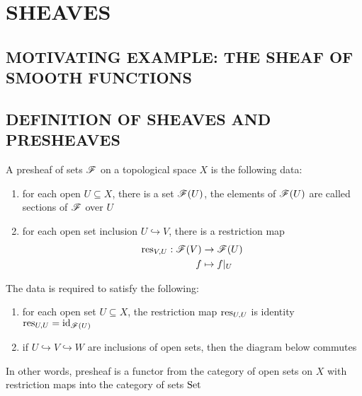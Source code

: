 \section{SHEAVES}

\subsection{MOTIVATING EXAMPLE: THE SHEAF OF SMOOTH FUNCTIONS}


\subsection{DEFINITION OF SHEAVES AND PRESHEAVES}

\begin{definition}
	A presheaf of sets $\mathscr{F}$ on a topological space $X$ is the following data:
	\begin{enumerate}
		\item for each open $U \subseteq X$, there is a set $\mathscr{F}(U)$, the elements of $\mathscr{F}(U)$ are called sections of $\mathscr{F}$ over $U$
		
		\item for each open set inclusion $U \hookrightarrow V$, there is a restriction map
		\begin{align*}
			\operatorname{res}_{V, U}: \mathscr{F}(V) &\to \mathscr{F}(U) \\
											   f &\mapsto f\vert_U
		\end{align*}
	\end{enumerate}
	
	The data is required to satisfy the following:
	\begin{enumerate}
		\item for each open set $U \subseteq X$, the restriction map $\operatorname{res}_{U, U}$ is identity$\operatorname{res}_{U, U} = \operatorname{id}_{\mathscr{F}(U)}$
		\item if $U \hookrightarrow V \hookrightarrow W$ are inclusions of open sets, then the diagram below commutes
		\begin{center}
		\end{center}
	\end{enumerate}
	
	In other words, presheaf is a functor from the category of open sets on $X$ with restriction maps into the category of sets $\operatorname{Set}$
\end{definition}

